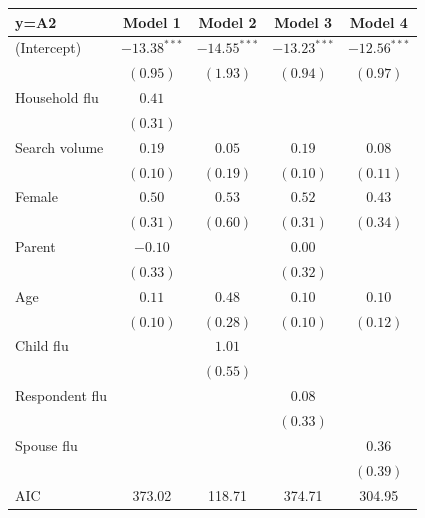 \documentclass[12pt]{article}
\begin{document}
\begin{table}
\begin{center}
\begin{tabular}{l c c c c }
\hline
y=A2 & Model 1 & Model 2 & Model 3 & Model 4 \\
\hline
(Intercept)    & $-13.38^{***}$ & $-14.55^{***}$ & $-13.23^{***}$ & $-12.56^{***}$ \\
               & $(0.95)$       & $(1.93)$       & $(0.94)$       & $(0.97)$       \\
Household flu  & $0.41$         &                &                &                \\
               & $(0.31)$       &                &                &                \\
Search volume         & $0.19$         & $0.05$         & $0.19$         & $0.08$         \\
               & $(0.10)$       & $(0.19)$       & $(0.10)$       & $(0.11)$       \\
Female         & $0.50$         & $0.53$         & $0.52$         & $0.43$         \\
               & $(0.31)$       & $(0.60)$       & $(0.31)$       & $(0.34)$       \\
Parent         & $-0.10$        &                & $0.00$         &                \\
               & $(0.33)$       &                & $(0.32)$       &                \\
Age            & $0.11$         & $0.48$         & $0.10$         & $0.10$         \\
               & $(0.10)$       & $(0.28)$       & $(0.10)$       & $(0.12)$       \\
Child flu         &                & $1.01$         &                &                \\
               &                & $(0.55)$       &                &                \\
Respondent flu          &                &                & $0.08$         &                \\
               &                &                & $(0.33)$       &                \\
Spouse flu          &                &                &                & $0.36$         \\
               &                &                &                & $(0.39)$       \\
\hline
AIC            & 373.02         & 118.71         & 374.71         & 304.95         \\

\end{tabular}
\end{center}
\end{table}
\end{document}
